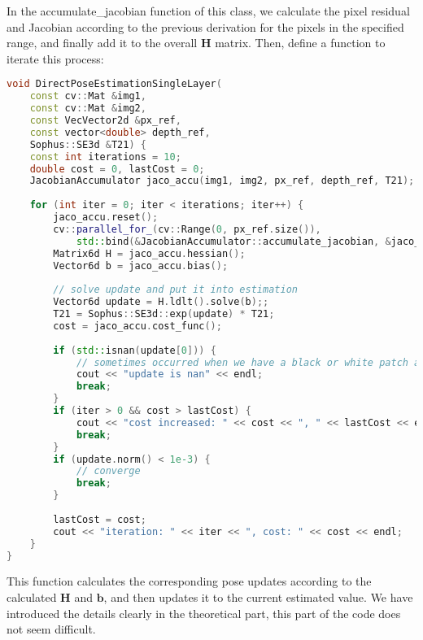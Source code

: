 In the accumulate\_jacobian function of this class, we calculate the pixel residual and Jacobian according to the previous derivation for the pixels in the specified range, and finally add it to the overall $\mathbf{H}$ matrix. Then, define a function to iterate this process:
\begin{lstlisting}[language=c++,caption=slambook2/ch8/direct_method.cpp (snippet)]
void DirectPoseEstimationSingleLayer(
	const cv::Mat &img1,
	const cv::Mat &img2,
	const VecVector2d &px_ref,
	const vector<double> depth_ref,
	Sophus::SE3d &T21) {
	const int iterations = 10;
	double cost = 0, lastCost = 0;
	JacobianAccumulator jaco_accu(img1, img2, px_ref, depth_ref, T21);
	
	for (int iter = 0; iter < iterations; iter++) {
		jaco_accu.reset();
		cv::parallel_for_(cv::Range(0, px_ref.size()),
			std::bind(&JacobianAccumulator::accumulate_jacobian, &jaco_accu, std::placeholders::_1));
		Matrix6d H = jaco_accu.hessian();
		Vector6d b = jaco_accu.bias();
		
		// solve update and put it into estimation
		Vector6d update = H.ldlt().solve(b);;
		T21 = Sophus::SE3d::exp(update) * T21;
		cost = jaco_accu.cost_func();
		
		if (std::isnan(update[0])) {
			// sometimes occurred when we have a black or white patch and H is irreversible
			cout << "update is nan" << endl;
			break;
		}
		if (iter > 0 && cost > lastCost) {
			cout << "cost increased: " << cost << ", " << lastCost << endl;
			break;
		}
		if (update.norm() < 1e-3) {
			// converge
			break;
		}
		
		lastCost = cost;
		cout << "iteration: " << iter << ", cost: " << cost << endl;
	}
}
\end{lstlisting}
This function calculates the corresponding pose updates according to the calculated $\mathbf{H}$ and $\mathbf{b}$, and then updates it to the current estimated value. We have introduced the details clearly in the theoretical part, this part of the code does not seem difficult.

